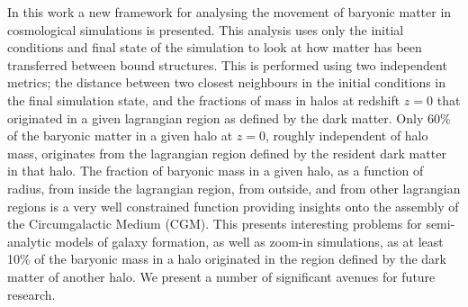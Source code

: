 In this work a new framework for analysing the movement of baryonic matter in
cosmological simulations is presented. This analysis uses only the initial
conditions and final state of the simulation to look at how matter has been
transferred between bound structures. This is performed using two independent
metrics; the distance between two closest neighbours in the initial conditions
in the final simulation state, and the fractions of mass in halos at redshift
$z=0$ that originated in a given lagrangian region as defined by the dark
matter. Only 60\% of the baryonic matter in a given halo at $z=0$, roughly
independent of halo mass, originates from the lagrangian region defined by the
resident dark matter in that halo. The fraction of baryonic mass in a given
halo, as a  function of radius, from inside the lagrangian region, from
outside, and from other lagrangian regions is a very well constrained function
providing insights onto the assembly of the Circumgalactic Medium (CGM). This
presents interesting problems for semi-analytic models of galaxy formation, as
well as zoom-in simulations, as at least 10\% of the baryonic mass in a halo
originated in the region defined by the dark matter of another halo. We present
a number of significant avenues for future research.
